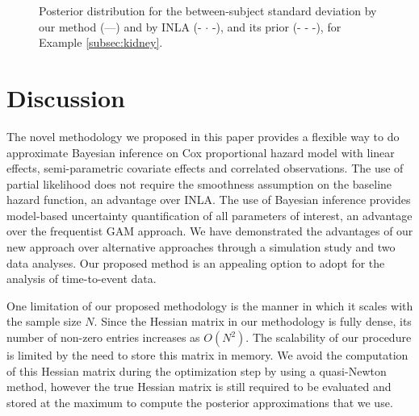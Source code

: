 \documentclass[num-refs,serif,10pt]{wiley-article}
\begin{document}
\begin{figure}[ht]
\centering
{}
\caption{Posterior distribution for the between-subject standard deviation by our method (---) and by INLA (- $\cdot$ -), and its prior (- - -), for Example \ref{subsec:kidney}.}
\label{fig:BetweenSubjectSD}
\end{figure}

\section{Discussion}\label{sec:discussion}

The novel methodology we proposed in this paper provides a flexible way to do approximate Bayesian inference on Cox proportional hazard model with linear effects, semi-parametric covariate effects and correlated observations. The use of  partial likelihood does not require the smoothness assumption on the baseline hazard function, an advantage over INLA. The use of Bayesian inference provides model-based uncertainty quantification of all parameters of interest, an advantage over the frequentist GAM approach. We have demonstrated the advantages of our new approach over alternative approaches through a simulation study and two data analyses. Our proposed method is an appealing option to adopt for the analysis of time-to-event data.

One limitation of our proposed methodology is the manner in which it scales with the sample size $N$. Since the Hessian matrix in our methodology is fully dense, its number of non-zero entries increases as $O(N^{2})$. The scalability of our procedure is limited by the need to store this matrix in memory. We avoid the computation of this Hessian matrix during the optimization step by using a quasi-Newton method, however the true Hessian matrix is still required to be evaluated and stored at the maximum to compute the posterior approximations that we use.
\end{document}
